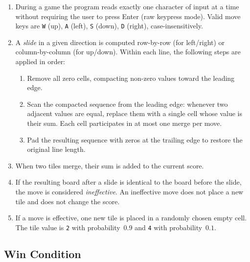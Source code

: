 \documentclass{article} %
\begin{document}
\begin{enumerate}[resume]

	\item During a game the program reads exactly one character of input at a time without
	      requiring the user to press Enter (raw keypress mode).
	      Valid move keys are \texttt{W} (up), \texttt{A} (left), \texttt{S} (down), \texttt{D} (right),
	      case-insensitively.

	\item A \emph{slide} in a given direction is computed row-by-row (for left/right) or
	      column-by-column (for up/down).
	      Within each line, the following steps are applied in order:
	      \begin{enumerate}[label=(\alph*)]
		      \item Remove all zero cells, compacting non-zero values toward the leading edge.
		      \item Scan the compacted sequence from the leading edge: whenever two adjacent
		            values are equal, replace them with a single cell whose value is their sum.
		            Each cell participates in at most one merge per move.
		      \item Pad the resulting sequence with zeros at the trailing edge to restore the
		            original line length.
	      \end{enumerate}

	\item When two tiles merge, their sum is added to the current score.

	\item If the resulting board after a slide is identical to the board before the slide,
	      the move is considered \emph{ineffective}.
	      An ineffective move does not place a new tile and does not change the score.

	\item If a move is effective, one new tile is placed in a randomly chosen empty cell.
	      The tile value is \texttt{2} with probability~$0.9$ and \texttt{4} with probability~$0.1$.

\end{enumerate}

\subsection{Win Condition}
\end{document}
